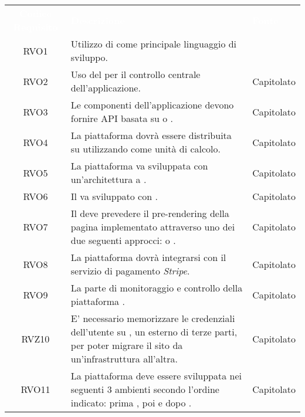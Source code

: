 \renewcommand{\arraystretch}{1.5}
\begin{longtable}{|c C{9.5cm} C{2.5cm}|} 
	
	\textcolor{white}{\textbf{Codice Requisito}}&
	\textcolor{white}{\textbf{Descrizione}}&
	\textcolor{white}{\textbf{Fonte}}\\	
	
	RVO1 & Utilizzo di  come principale linguaggio di sviluppo. &  \\
	
	RVO2 & Uso del   per il controllo centrale dell'applicazione. & Capitolato \\
	
	RVO3 & Le componenti dell'applicazione devono fornire API basata su  o . & Capitolato \\
	
	RVO4 & La piattaforma dovrà essere distribuita su  utilizzando  come unità di calcolo. & Capitolato \\
	
	RVO5 & La piattaforma va sviluppata con un'architettura a . & Capitolato \\
	
	RVO6 & Il  va sviluppato con . & Capitolato \\
	
	RVO7 & Il  deve prevedere il pre-rendering della pagina  implementato attraverso uno dei due seguenti approcci:  o . & Capitolato \\
	
	RVO8 & La piattaforma dovrà integrarsi con il servizio di pagamento \textit{Stripe}. & Capitolato \\
	
	RVO9 & La parte di monitoraggio e controllo della piattaforma . & Capitolato \\
	
	RVZ10 & E' necessario memorizzare le credenziali dell'utente su , un  esterno di terze parti, per poter migrare il sito da un'infrastruttura all'altra. & Capitolato \\
	
	RVO11 & La piattaforma deve essere sviluppata nei seguenti 3 ambienti secondo l'ordine indicato: prima , poi  e dopo . & Capitolato \\
	
\end{longtable}
